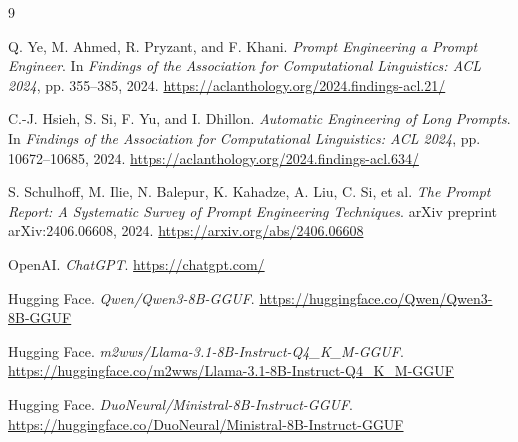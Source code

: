 \documentclass[pdflatex,sn-mathphys-num]{sn-jnl}%
\theoremstyle{thmstyleone}%
\theoremstyle{thmstyletwo}%
\theoremstyle{thmstylethree}%
\begin{document}
\begin{thebibliography}{9}

      Q. Ye, M. Ahmed, R. Pryzant, and F. Khani.
      \textit{Prompt Engineering a Prompt Engineer}.
      In \textit{Findings of the Association for Computational Linguistics: ACL 2024},
      pp. 355--385, 2024.
      \url{https://aclanthology.org/2024.findings-acl.21/}
      
      C.-J. Hsieh, S. Si, F. Yu, and I. Dhillon.
      \textit{Automatic Engineering of Long Prompts}.
      In \textit{Findings of the Association for Computational Linguistics: ACL 2024},
      pp. 10672--10685, 2024.
      \url{https://aclanthology.org/2024.findings-acl.634/}
      
      S. Schulhoff, M. Ilie, N. Balepur, K. Kahadze, A. Liu, C. Si, et al.
      \textit{The Prompt Report: A Systematic Survey of Prompt Engineering Techniques}.
      arXiv preprint arXiv:2406.06608, 2024.
      \url{https://arxiv.org/abs/2406.06608}
      
      OpenAI.
      \textit{ChatGPT}.
      \url{https://chatgpt.com/}
      
      Hugging Face.
      \textit{Qwen/Qwen3-8B-GGUF}.
      \url{https://huggingface.co/Qwen/Qwen3-8B-GGUF}
      
      Hugging Face.
      \textit{m2wws/Llama-3.1-8B-Instruct-Q4\_K\_M-GGUF}.
      \url{https://huggingface.co/m2wws/Llama-3.1-8B-Instruct-Q4_K_M-GGUF}
      
      Hugging Face.
      \textit{DuoNeural/Ministral-8B-Instruct-GGUF}.
      \url{https://huggingface.co/DuoNeural/Ministral-8B-Instruct-GGUF}
      
\end{thebibliography}
\end{document}
